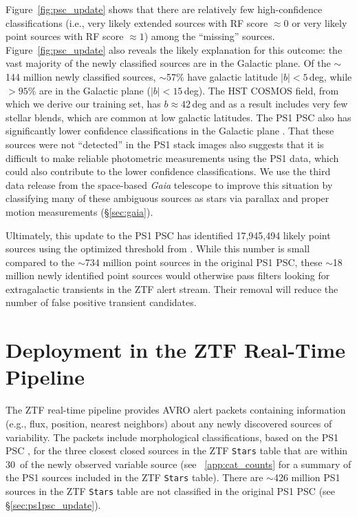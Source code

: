 \documentclass[twocolumn]{aastex63}
\begin{document}
Figure~\ref{fig:psc_update} shows that there are relatively few
high-confidence classifications (i.e., very likely extended sources with RF
score $\approx 0$ or very likely point sources with RF score $\approx 1$)
among the ``missing'' sources. Figure~\ref{fig:psc_update} also reveals the
likely explanation for this outcome: the vast majority of the newly classified
sources are in the Galactic plane. Of the $\sim$144 million newly classified
sources, $\sim$57\% have galactic latitude $\lvert b \rvert < 5$\,deg, while
$> 95$\% are in the Galactic plane ($\lvert b \rvert < 15$\,deg). The HST
COSMOS field, from which we derive our training set, has $b \approx 42$\,deg
and as a result includes very few stellar blends, which are common at low
galactic latitudes. The PS1 PSC also has significantly lower confidence
classifications in the Galactic plane \citep[see Figure~8 in][]{Tachibana18}.
That these sources were not ``detected'' in the PS1 stack images also suggests
that it is difficult to make reliable photometric measurements using the PS1
data, which could also contribute to the lower confidence classifications. We
use the third data release from the space-based \textit{Gaia} telescope
\citep{Perryman01} to improve this situation by classifying many of these
ambiguous sources as stars via parallax and proper motion measurements
(\S\ref{sec:gaia}).

Ultimately, this update to the PS1 PSC has identified 17,945,494 likely point
sources using the optimized threshold from \citet[][RF score $\ge
0.83$]{Tachibana18}. While this number is small compared to the $\sim$734
million point sources in the original PS1 PSC, these $\sim$18 million newly
identified point sources would otherwise pass filters looking for
extragalactic transients in the ZTF alert stream. Their removal will reduce
the number of false positive transient candidates.

\section{Deployment in the ZTF Real-Time Pipeline}\label{sec:ztf_pipeline}

The ZTF real-time pipeline \citep{Masci19} provides AVRO alert packets
\citep[see][]{Patterson19} containing information (e.g., flux, position,
nearest neighbors) about any newly discovered sources of variability. The
packets include morphological classifications, based on the PS1 PSC
\citep{Tachibana18}, for the three closest closed sources in the ZTF
\texttt{Stars} table that are within 30\arcsec\ of the newly observed variable
source (see ~\ref{app:cat_counts} for a summary of the PS1 sources included in
the ZTF \texttt{Stars} table). There are $\sim$426 million PS1 sources in the
ZTF \texttt{Stars} table are not classified in the original PS1 PSC (see
\S\ref{sec:ps1psc_update}).
\end{document}
